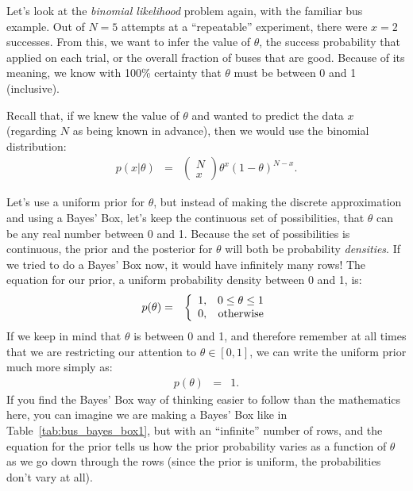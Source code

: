 Let's look at the {\it binomial likelihood} problem again, with the familiar
bus example. Out of $N=5$ attempts at a ``repeatable'' experiment, there were
$x=2$ successes. From this, we want to infer the value of $\theta$, the
success probability that applied on each trial, or the overall fraction of 
buses that are good. Because of its meaning, we know
with 100\% certainty that $\theta$ must be between 0 and 1 (inclusive).

Recall that, if we knew the
value of $\theta$ and wanted to predict the data $x$ (regarding $N$ as being
known in advance), then we would use the binomial distribution:
\begin{eqnarray}
p(x|\theta) &=& \left(\begin{array}{c}N \\ x\end{array}\right)
\theta^x\left(1-\theta\right)^{N - x}.\label{eq:binomial_likelihood}
\end{eqnarray}

Let's use a uniform prior for $\theta$, but instead of making the discrete
approximation and using a Bayes' Box, let's keep the continuous set of possibilities,
that $\theta$ can be any real number between 0 and 1. Because the set of
possibilities is continuous, the prior and the posterior for $\theta$ will both
be probability {\it densities}. If we tried to do a Bayes' Box now, it would
have infinitely many rows!
The equation for our prior, a uniform probability density between 0 and 1, is:
\begin{eqnarray}
p(\theta) &=& \left\{
\begin{array}{lr}
1, & 0 \leq \theta \leq 1\\
0, & \textnormal{otherwise}
\end{array}
\right.\label{eq:uniform}
\end{eqnarray}
If we keep in mind that $\theta$ is between 0 and 1, and therefore remember at
all times that we are restricting our attention to $\theta \in [0, 1]$, we can
write the uniform prior much more simply as:
\begin{eqnarray}
p(\theta) &=& 1.
\end{eqnarray}
If you find the Bayes' Box way of thinking easier to follow than the mathematics
here, you can imagine we are making a Bayes' Box like in
Table~\ref{tab:bus_bayes_box1}, but with an ``infinite'' number of rows, and
the equation for the prior tells us how the prior probability varies as a function
of $\theta$ as we go down through the rows (since the prior is uniform, the
probabilities don't vary at all).

